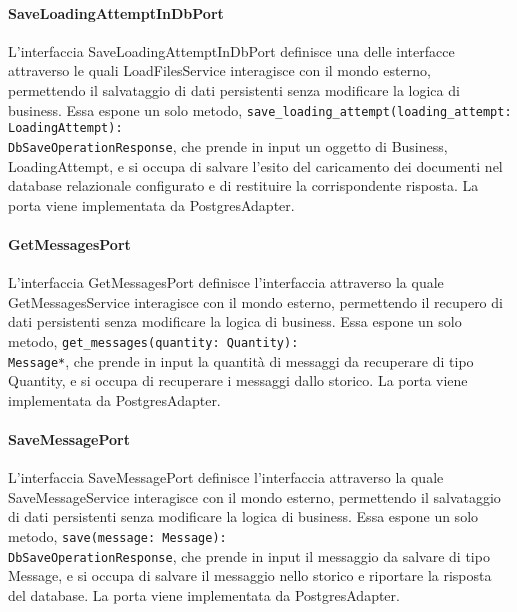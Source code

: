 \paragraph{SaveLoadingAttemptInDbPort}
\label{sec:save_loading_attempt_in_db_port}
L'interfaccia SaveLoadingAttemptInDbPort definisce una delle interfacce attraverso le quali LoadFilesService interagisce con il mondo esterno, permettendo il salvataggio di dati persistenti senza modificare la logica di business. Essa espone un solo metodo, \texttt{save\_loading\_attempt(loading\_attempt: LoadingAttempt):\\ DbSaveOperationResponse}, che prende in input un oggetto di Business, LoadingAttempt, e si occupa di salvare l'esito del caricamento dei documenti nel database relazionale configurato e di restituire la corrispondente risposta. La porta viene implementata da PostgresAdapter.

\paragraph{GetMessagesPort}
\label{sec:get_messages_port}
L'interfaccia GetMessagesPort definisce l'interfaccia attraverso la quale GetMessagesService interagisce con il mondo esterno, permettendo il recupero di dati persistenti senza modificare la logica di business. Essa espone un solo metodo, \texttt{get\_messages(quantity: Quantity):\\ Message*}, che prende in input la quantità di messaggi da recuperare di tipo Quantity, e si occupa di recuperare i messaggi dallo storico. La porta viene implementata da PostgresAdapter.

\paragraph{SaveMessagePort}
\label{sec:save_message_port}
L'interfaccia SaveMessagePort definisce l'interfaccia attraverso la quale SaveMessageService interagisce con il mondo esterno, permettendo il salvataggio di dati persistenti senza modificare la logica di business. Essa espone un solo metodo, \texttt{save(message: Message):\\ DbSaveOperationResponse}, che prende in input il messaggio da salvare di tipo Message, e si occupa di salvare il messaggio nello storico e riportare la risposta del database. La porta viene implementata da PostgresAdapter.

\newpage


\label{sec:adapter}

